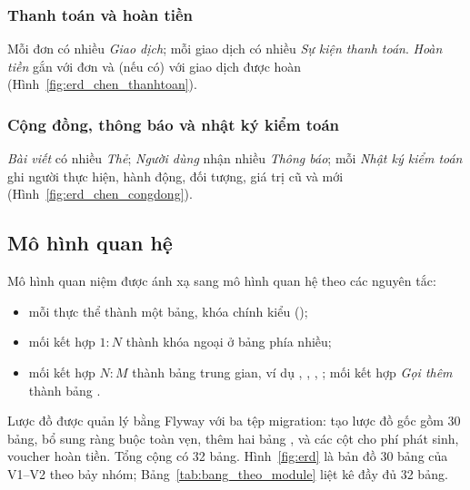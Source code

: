 \subsubsection{Thanh toán và hoàn tiền}
Mỗi đơn có nhiều \emph{Giao dịch}; mỗi giao dịch có nhiều \emph{Sự kiện thanh toán}. \emph{Hoàn tiền} gắn với đơn và (nếu có) với giao dịch được hoàn (Hình~\ref{fig:erd_chen_thanhtoan}).


\subsubsection{Cộng đồng, thông báo và nhật ký kiểm toán}
\emph{Bài viết} có nhiều \emph{Thẻ}; \emph{Người dùng} nhận nhiều \emph{Thông báo}; mỗi \emph{Nhật ký kiểm toán} ghi người thực hiện, hành động, đối tượng, giá trị cũ và mới (Hình~\ref{fig:erd_chen_congdong}).


\subsection{Mô hình quan hệ}
\label{ssec:erd_vat_ly}

Mô hình quan niệm được ánh xạ sang mô hình quan hệ theo các nguyên tắc:
\begin{itemize}
    \item mỗi thực thể thành một bảng, khóa chính kiểu  ();
    \item mối kết hợp $1:N$ thành khóa ngoại ở bảng phía nhiều;
    \item mối kết hợp $N:M$ thành bảng trung gian, ví dụ , , , ; mối kết hợp \emph{Gọi thêm} thành bảng .
\end{itemize}

Lược đồ được quản lý bằng Flyway với ba tệp migration:  tạo lược đồ gốc gồm 30 bảng,  bổ sung ràng buộc toàn vẹn,  thêm hai bảng ,  và các cột cho phí phát sinh, voucher hoàn tiền. Tổng cộng có 32 bảng. Hình~\ref{fig:erd} là bản đồ 30 bảng của V1--V2 theo bảy nhóm; Bảng~\ref{tab:bang_theo_module} liệt kê đầy đủ 32 bảng.

